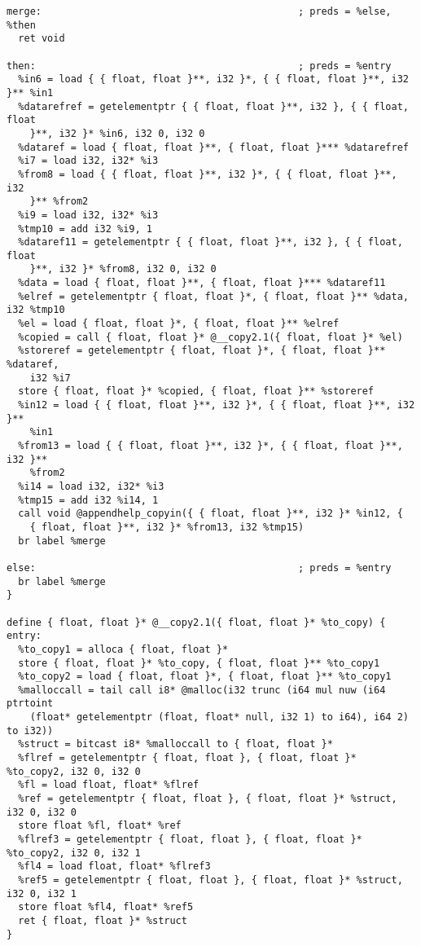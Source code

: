 \documentclass[main.tex]{subfiles}
\begin{document}
{\begin{lstlisting}
merge:                                            ; preds = %else, %then
  ret void

then:                                             ; preds = %entry
  %in6 = load { { float, float }**, i32 }*, { { float, float }**, i32 }** %in1
  %datarefref = getelementptr { { float, float }**, i32 }, { { float, float
    }**, i32 }* %in6, i32 0, i32 0
  %dataref = load { float, float }**, { float, float }*** %datarefref
  %i7 = load i32, i32* %i3
  %from8 = load { { float, float }**, i32 }*, { { float, float }**, i32
    }** %from2
  %i9 = load i32, i32* %i3
  %tmp10 = add i32 %i9, 1
  %dataref11 = getelementptr { { float, float }**, i32 }, { { float, float
    }**, i32 }* %from8, i32 0, i32 0
  %data = load { float, float }**, { float, float }*** %dataref11
  %elref = getelementptr { float, float }*, { float, float }** %data, i32 %tmp10
  %el = load { float, float }*, { float, float }** %elref
  %copied = call { float, float }* @__copy2.1({ float, float }* %el)
  %storeref = getelementptr { float, float }*, { float, float }** %dataref, 
    i32 %i7
  store { float, float }* %copied, { float, float }** %storeref
  %in12 = load { { float, float }**, i32 }*, { { float, float }**, i32 }**
    %in1
  %from13 = load { { float, float }**, i32 }*, { { float, float }**, i32 }**
    %from2
  %i14 = load i32, i32* %i3
  %tmp15 = add i32 %i14, 1
  call void @appendhelp_copyin({ { float, float }**, i32 }* %in12, { 
    { float, float }**, i32 }* %from13, i32 %tmp15)
  br label %merge

else:                                             ; preds = %entry
  br label %merge
}

define { float, float }* @__copy2.1({ float, float }* %to_copy) {
entry:
  %to_copy1 = alloca { float, float }*
  store { float, float }* %to_copy, { float, float }** %to_copy1
  %to_copy2 = load { float, float }*, { float, float }** %to_copy1
  %malloccall = tail call i8* @malloc(i32 trunc (i64 mul nuw (i64 ptrtoint
    (float* getelementptr (float, float* null, i32 1) to i64), i64 2) to i32))
  %struct = bitcast i8* %malloccall to { float, float }*
  %flref = getelementptr { float, float }, { float, float }* %to_copy2, i32 0, i32 0
  %fl = load float, float* %flref
  %ref = getelementptr { float, float }, { float, float }* %struct, i32 0, i32 0
  store float %fl, float* %ref
  %flref3 = getelementptr { float, float }, { float, float }* %to_copy2, i32 0, i32 1
  %fl4 = load float, float* %flref3
  %ref5 = getelementptr { float, float }, { float, float }* %struct, i32 0, i32 1
  store float %fl4, float* %ref5
  ret { float, float }* %struct
}


\end{lstlisting}}
\end{document}
